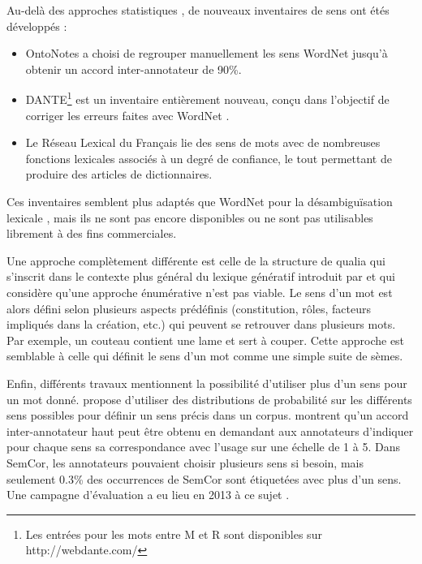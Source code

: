 Au-delà des approches statistiques \citep{snow2007learning}, de nouveaux
inventaires de sens ont étés développés :

\begin{itemize}

    \item OntoNotes \citep{hovy2006ontonotes} a choisi de regrouper
        manuellement les sens WordNet jusqu'à obtenir un accord
        inter-annotateur de 90\%.

    \item DANTE\footnote{Les entrées pour les mots entre M et R sont
        disponibles sur http://webdante.com/} \citep{mccarthy2010dante} est un
        inventaire entièrement nouveau, conçu dans l'objectif de corriger les
        erreurs faites avec WordNet \citep{kilgarriff2010detailed}.

    \item Le Réseau Lexical du Français \citep{gader2014lexicon} lie des sens de
        mots avec de nombreuses fonctions lexicales associés à un degré de
        confiance, le tout permettant de produire des articles de dictionnaires.

\end{itemize}

Ces inventaires semblent plus adaptés que WordNet pour la désambiguïsation
lexicale \citep{navigli2012quick}, mais ils ne sont pas encore disponibles ou
ne sont pas utilisables librement à des fins commerciales.

Une approche complètement différente est celle de la structure de qualia
\citep{johnston1996qualia} qui s'inscrit dans le contexte plus général du
lexique génératif introduit par \cite{pustejovsky1991generative} et qui
considère qu'une approche énumérative n'est pas viable. Le sens d'un mot est
alors défini selon plusieurs aspects prédéfinis (constitution, rôles, facteurs
impliqués dans la création, etc.) qui peuvent se retrouver dans plusieurs mots.
Par exemple, un couteau contient une lame et sert à couper. Cette approche est
semblable à celle qui définit le sens d'un mot comme une simple suite de sèmes.

Enfin, différents travaux mentionnent la possibilité d'utiliser plus d'un sens
pour un mot donné. \cite{smith2011rumble} propose d'utiliser des distributions
de probabilité sur les différents sens possibles pour définir un sens précis
dans un corpus. \cite{erk2013measuring} montrent qu'un accord inter-annotateur
haut peut être obtenu en demandant aux annotateurs d'indiquer pour chaque sens
sa correspondance avec l'usage sur une échelle de 1 à 5. Dans SemCor, les
annotateurs pouvaient choisir plusieurs sens si besoin, mais seulement 0.3\%
des occurrences de SemCor sont étiquetées avec plus d'un sens. Une campagne
d'évaluation a eu lieu en 2013 à ce sujet \citep{jurgens2013semeval}.

